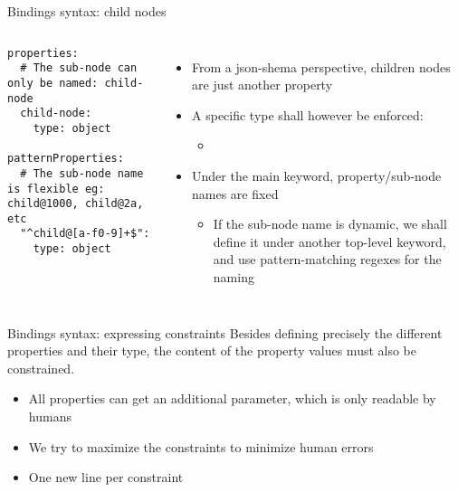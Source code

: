 \begin{frame}[fragile]{Bindings syntax: child nodes}
  \begin{columns}
    \begin{block}{}
      {\fontsize{5}{6}\selectfont
\begin{verbatim}
properties:
  # The sub-node can only be named: child-node
  child-node:
    type: object

patternProperties:
  # The sub-node name is flexible eg: child@1000, child@2a, etc
  "^child@[a-f0-9]+$":
    type: object
\end{verbatim}
      }
    \end{block}
    \begin{itemize}
    \item From a json-shema perspective, children nodes are just another
      property
    \item A specific type shall however be enforced:
      \begin{itemize}
      \item {}
      \end{itemize}
    \item Under the main  keyword, property/sub-node
      names are fixed
      \begin{itemize}
      \item If the sub-node name is dynamic, we shall define it under
        another top-level keyword,  and use
        pattern-matching regexes for the naming
      \end{itemize}
    \end{itemize}
  \end{columns}
\end{frame}

\begin{frame}{Bindings syntax: expressing constraints}
  Besides defining precisely the different properties and their type,
  the content of the property values must also be constrained.
  \begin{itemize}
  \item All properties can get an additional 
    parameter, which is only readable by humans
  \item We try to maximize the constraints to minimize human errors
  \item One new line per constraint
  \end{itemize}
\end{frame}

